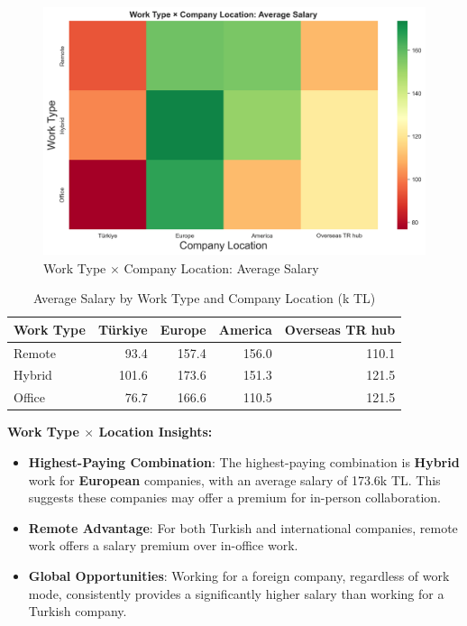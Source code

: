 \documentclass[12pt,a4paper]{article}
\begin{document}
\begin{figure}[H]
	\centering
	\includegraphics[width=\textwidth]{figures/heatmap_worktype_location_salary.png}
	\caption{Work Type $\times$ Company Location: Average Salary}
\end{figure}

\begin{table}[H]
	\centering
	\small
	\begin{tabular}{lrrrr}
		\toprule
		\textbf{Work Type} & \textbf{Türkiye} & \textbf{Europe} & \textbf{America} & \textbf{Overseas TR hub} \\
		\midrule
		Remote             & 93.4              & 157.4           & 156.0            & 110.1                    \\
		Hybrid             & 101.6             & 173.6           & 151.3            & 121.5                    \\
		Office             & 76.7              & 166.6           & 110.5            & 121.5                    \\
		\bottomrule
	\end{tabular}
	\caption{Average Salary by Work Type and Company Location (k TL)}
\end{table}

\textbf{Work Type $\times$ Location Insights:}
\begin{itemize}
	\item \textbf{Highest-Paying Combination}: The highest-paying combination is \textbf{Hybrid} work for \textbf{European} companies, with an average salary of 173.6k TL. This suggests these companies may offer a premium for in-person collaboration.
	\item \textbf{Remote Advantage}: For both Turkish and international companies, remote work offers a salary premium over in-office work.
	\item \textbf{Global Opportunities}: Working for a foreign company, regardless of work mode, consistently provides a significantly higher salary than working for a Turkish company.
\end{itemize}
\end{document}
